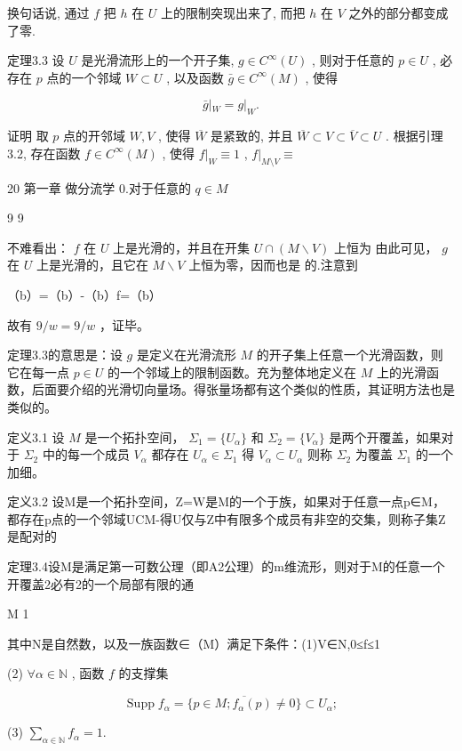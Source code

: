换句话说, 通过  $f$  把  $h$  在  $U$  上的限制突现出来了, 而把  $h$  在  $V$  之外的部分都变成了零.

定理3.3 设  $U$  是光滑流形上的一个开子集,  $g \in C^{\infty}(U)$ , 则对于任意的  $p \in U$ , 必存在  $p$  点的一个邻域  $W \subset U$ , 以及函数  $\bar{g} \in C^{\infty}(M)$ , 使得

$$
\bar {g} | _ {W} = g | _ {W}.
$$

证明 取  $p$  点的开邻域  $W, V$ , 使得  $\overline{W}$  是紧致的, 并且  $\overline{W} \subset V \subset \overline{V} \subset U$ . 根据引理3.2, 存在函数  $f \in C^{\infty}(M)$ , 使得  $f|_{W} \equiv 1$ ,  $f|_{M \setminus V} \equiv$

20 第一章 做分流学 0.对于任意的  $q\in M$

9 9

不难看出：  $f$  在  $U$  上是光滑的，并且在开集  $U\cap (M\backslash V)$  上恒为 由此可见，  $g$  在  $U$  上是光滑的，且它在  $M\backslash V$  上恒为零，因而也是 的.注意到

（b）=（b）-（b）f=（b）

故有  $9 / w = 9 / w$  ，证毕。

定理3.3的意思是：设  $g$  是定义在光滑流形  $M$  的开子集上任意一个光滑函数，则它在每一点  $p \in U$  的一个邻域上的限制函数。充为整体地定义在  $M$  上的光滑函数，后面要介绍的光滑切向量场。得张量场都有这个类似的性质，其证明方法也是类似的。

定义3.1 设  $M$  是一个拓扑空间， $\Sigma_1 = \{U_\alpha\}$  和  $\Sigma_2 = \{V_\alpha\}$  是两个开覆盖，如果对于  $\Sigma_2$  中的每一个成员  $V_\alpha$  都存在  $U_\alpha \in \Sigma_1$  得  $V_\alpha \subset U_\alpha$  则称  $\Sigma_2$  为覆盖  $\Sigma_1$  的一个加细。

定义3.2 设M是一个拓扑空间，Z={W}是M的一个于族，如果对于任意一点p∈M，都存在p点的一个邻域UCM-得U仅与Z中有限多个成员有非空的交集，则称子集Z是配对的

定理3.4设M是满足第一可数公理（即A2公理）的m维流形，则对于M的任意一个开覆盖2必有2的一个局部有限的通

M 1

其中N是自然数，以及一族函数∈（M）满足下条件：(1)V∈N,0≤f≤1

(2)  $\forall \alpha \in \mathbb{N}$ , 函数  $f$  的支撑集

$$
\operatorname {S u p p} f _ {\alpha} = \overline {{\{p \in M ; f _ {\alpha} (p) \neq 0 \}}} \subset U _ {\alpha};
$$

(3)  $\sum_{\alpha \in \mathbb{N}}f_{\alpha} = 1.$

